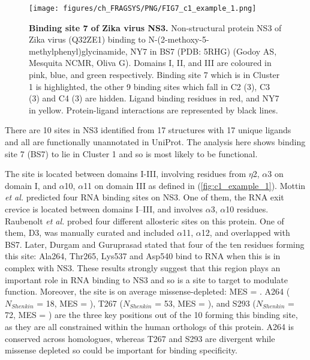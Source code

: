\begin{figure}[htb!]
    \centering
    \texttt{[image: figures/ch\_FRAGSYS/PNG/FIG7\_c1\_example\_1.png]}
    \caption[Binding site 7 of Zika virus NS3]{\textbf{Binding site 7 of Zika virus NS3.} Non-structural protein NS3 of Zika virus (Q32ZE1) binding to N-(2-methoxy-5-methylphenyl)glycinamide, NY7 in BS7 (PDB: 5RHG) (Godoy AS, Mesquita NCMR, Oliva G). Domains I, II, and III are coloured in pink, blue, and green respectively. Binding site 7 which is in Cluster 1 is highlighted, the other 9 binding sites which fall in C2 (3), C3 (3) and C4 (3) are hidden. Ligand binding residues in red, and NY7 in yellow. Protein-ligand interactions are represented by black lines.}
    \label{fig:c1_example_1}
\end{figure}

There are 10 sites in NS3 identified from 17 structures with 17 unique ligands and all are functionally unannotated in UniProt. The analysis here shows binding site 7 (BS7) to lie in Cluster 1 and so is most likely to be functional.

The site is located between domains I-III, involving residues from $\eta$2, $\alpha$3 on domain I, and $\alpha$10, $\alpha$11 on domain III as defined in \cite{TIAN_2016_ZIKV} (\autoref{fig:c1_example_1}). Mottin \textit{et al.} \cite{MOTTIN_2017_ZIKA_HELICASE} predicted four RNA binding sites on NS3. One of them, the RNA exit crevice is located between domains I–III, and involves $\alpha$3, $\alpha$10 residues. Raubenolt \textit{et al.} \cite{RAUBENOLT_2021_ZIKA_ALLOSTERIC} probed four different allosteric sites on this protein. One of them, D3, was manually curated and included $\alpha$11, $\alpha$12, and overlapped with BS7. Later, Durgam and Guruprasad \cite{DURGAM_2022_ZIKA_ATP} stated that four of the ten residues forming this site: Ala264, Thr265, Lys537 and Asp540 bind to RNA when this is in complex with NS3. These results strongly suggest that this region plays an important role in RNA binding to NS3 and so is a site to target to modulate function. Moreover, the site is on average missense-depleted: MES =  . A264 ($N_{Shenkin}$ = 18, MES = ), T267 ($N_{Shenkin}$ = 53, MES = ), and S293 ($N_{Shenkin}$ = 72, MES =  ) are the three key positions out of the 10 forming this binding site, as they are all constrained within the human orthologs of this protein. A264 is conserved across homologues, whereas T267 and S293 are divergent while missense depleted so could be important for binding specificity.

